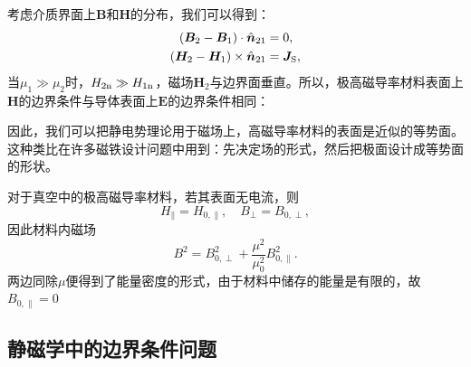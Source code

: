考虑介质界面上$\bm B$和$\bm H$的分布，我们可以得到：
\begin{align}
    \label{eqn:Bn2-Bn1}
    (\bm B_2-\bm B_1)\cdot\mathop{}\!\hat{\bm{n}}_{21}&=0,\\
    \label{eqn:Ht2-Ht1}
    (\bm H_2-\bm H_1)\times\mathop{}\!\hat{\bm{n}}_{21}&=\bm J_\text S,
\end{align}
当$\mu_1\gg\mu_2$时，$H_{2\text n}\gg H_{1\text n}$，磁场$\bm H_2$与边界面垂直。所以，极高磁导率材料表面上$\bm H$的边界条件与导体表面上$\bm E$的边界条件相同：
\begin{center}
\end{center}
因此，我们可以把静电势理论用于磁场上，高磁导率材料的表面是近似的等势面。这种类比在许多磁铁设计问题中用到：先决定场的形式，然后把极面设计成等势面的形状。
\begin{example}{}{}
    对于真空中的极高磁导率材料，若其表面无电流，则
    \[
        H_\parallel=H_{0,\parallel},\quad B_\perp=B_{0,\perp},
    \]
    因此材料内磁场
    \[
        B^2=B_{0,\perp}^2+\frac{\mu^2}{\mu_0^2}B_{0,\parallel}^2.
    \]
    两边同除$\mu$便得到了能量密度的形式，由于材料中储存的能量是有限的，故$B_{0,\parallel}=0$
\end{example}

\subsection{静磁学中的边界条件问题}
\label{ssec:boundary-value problems in magnetostatics}


